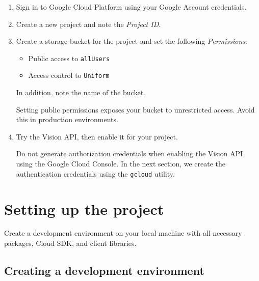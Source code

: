 \documentclass{article}
\begin{document}
\begin{enumerate}
    \item Sign in to Google Cloud Platform using your Google Account credentials.
    
    \item Create a new project and note the \textit{Project ID}.
    
    \item Create a storage bucket for the project and set the following \textit{Permissions}:
    \begin{itemize}
        \item Public access to \texttt{allUsers}
        \item Access control to \texttt{Uniform}
    \end{itemize}
    
    In addition, note the name of the bucket.
    
    \begin{tcolorbox}[colback=yellow!5!white,colframe=orange!75!black,title=Warning]
    Setting public permissions exposes your bucket to unrestricted access. Avoid this in production environments.
    \end{tcolorbox}
    
    \item Try the Vision API, then enable it for your project.
    
    \begin{tcolorbox}[colback=green!5!white,colframe=green!75!black,title=Tip]
    Do not generate authorization credentials when enabling the Vision API using the Google Cloud Console. In the next section, we create the authentication credentials using the \texttt{gcloud} utility.
    \end{tcolorbox}
\end{enumerate}

\section*{Setting up the project}

Create a development environment on your local machine with all necessary packages, Cloud SDK, and client libraries.

\subsection*{Creating a development environment}
\end{document}
